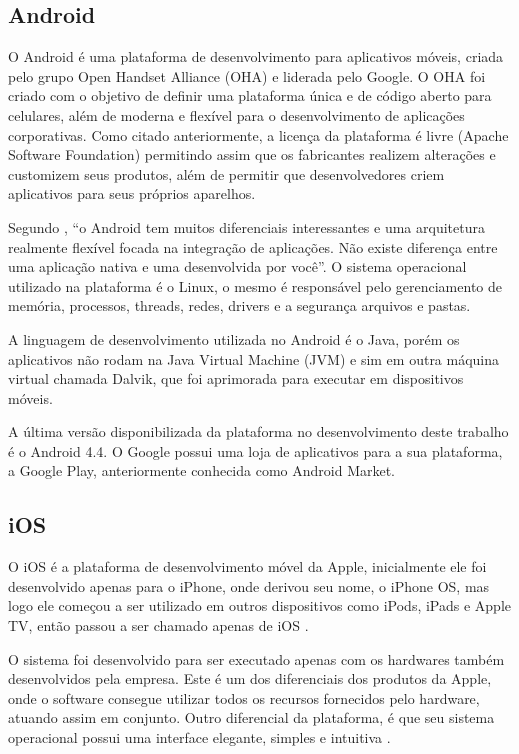 \documentclass[
	12pt,				%
	openright,			%
	oneside,			%
	a4paper,			%
	chapter=TITLE,		%
	section=TITLE,		%
	english,			%
	french,				%
	spanish,			%
	brazil				%
	]{abntex2}
\begin{document}
\subsection{Android}
O Android é uma plataforma de desenvolvimento para aplicativos móveis, criada pelo grupo Open Handset Alliance (OHA) e liderada pelo Google. O OHA foi criado com o objetivo de definir uma plataforma única e de código aberto para celulares, além de moderna e flexível para o desenvolvimento de aplicações corporativas. Como citado anteriormente, a licença da plataforma é livre (Apache Software Foundation) permitindo assim que os fabricantes realizem alterações e customizem seus produtos, além de permitir que desenvolvedores criem aplicativos para seus próprios aparelhos. 

Segundo , “o Android tem muitos diferenciais interessantes e uma arquitetura realmente flexível focada na integração de aplicações. Não existe diferença entre uma aplicação nativa e uma desenvolvida por você”. O sistema operacional utilizado na plataforma é o Linux, o mesmo é responsável pelo gerenciamento de memória, processos, threads, redes, drivers e a segurança arquivos e pastas. 

A linguagem de desenvolvimento utilizada no Android é o Java, porém os aplicativos não rodam na Java Virtual Machine (JVM) e sim em outra máquina virtual chamada Dalvik, que foi aprimorada para executar em dispositivos móveis. 

A última versão disponibilizada da plataforma no desenvolvimento deste trabalho é o Android 4.4. O Google possui uma loja de aplicativos para a sua plataforma, a Google Play, anteriormente conhecida como Android Market.

\subsection{iOS}
O iOS é a plataforma de desenvolvimento móvel da Apple, inicialmente ele foi desenvolvido apenas para o iPhone, onde derivou seu nome, o iPhone OS, mas logo ele começou a ser utilizado em outros dispositivos como iPods, iPads e Apple TV, então passou a ser chamado apenas de iOS \cite{milaniIOS}. 

O sistema foi desenvolvido para ser executado apenas com os hardwares também desenvolvidos pela empresa. Este é um dos diferenciais dos produtos da Apple, onde o software consegue utilizar todos os recursos fornecidos pelo hardware, atuando assim em conjunto. Outro diferencial da plataforma, é que seu sistema operacional possui uma interface elegante, simples e intuitiva \cite{milaniIOS}. 
\end{document}
